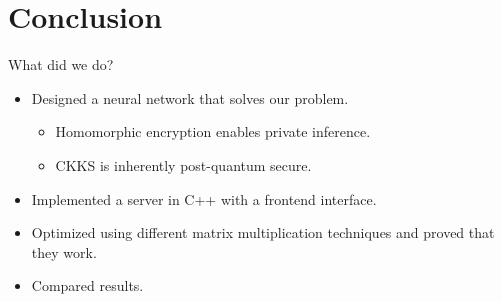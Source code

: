 \section{Conclusion}
\begin{frame}{What did we do?}
  \begin{itemize}
    \item Designed a neural network that solves our problem.
          \begin{itemize}
            \item Homomorphic encryption enables private inference.
            \item CKKS is inherently post-quantum secure.
          \end{itemize}
    \item Implemented a server in C++ with a frontend interface.
    \item Optimized using different matrix multiplication techniques and proved that they work.
    \item Compared results.
  \end{itemize}
\end{frame}
